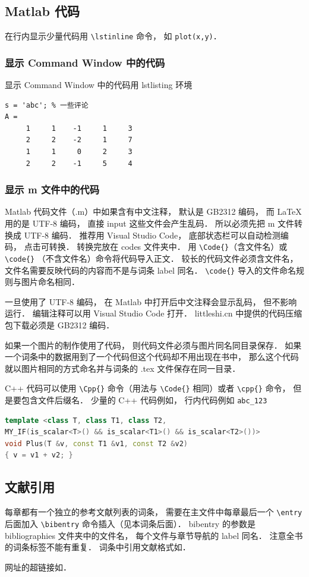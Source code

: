 \subsection{Matlab 代码}
在行内显示少量代码用 \lstinline|\lstinline| 命令， 如 \lstinline|plot(x,y)|．
\subsubsection{显示  Command Window 中的代码}
显示  Command Window 中的代码用 lstlisting 环境
\begin{lstlisting}[language=MatlabCom]
s = 'abc'; % 一些评论
A =
     1     1    -1     1     3
     2     2    -2     1     7
     1     1     0     2     3
     2     2    -1     5     4
\end{lstlisting}

\subsubsection{显示 m 文件中的代码}

Matlab 代码文件（.m）中如果含有中文注释， 默认是 GB2312 编码， 而 LaTeX 用的是 UTF-8 编码， 直接 input 这些文件会产生乱码． 所以必须先把 m 文件转换成 UTF-8 编码． 推荐用 Visual Studio Code， 底部状态栏可以自动检测编码， 点击可转换． 转换完放在 codes 文件夹中． 用 \lstinline|\Code{}|（含文件名）或  \lstinline|\code{}| （不含文件名）命令将代码导入正文． 较长的代码文件必须含文件名， 文件名需要反映代码的内容而不是与词条 label 同名． \lstinline|\code{}| 导入的文件命名规则与图片命名相同．

一旦使用了 UTF-8 编码， 在 Matlab 中打开后中文注释会显示乱码， 但不影响运行． 编辑注释可以用 Visual Studio Code 打开． littleshi.cn 中提供的代码压缩包下载必须是 GB2312 编码．

如果一个图片的制作使用了代码， 则代码文件必须与图片同名同目录保存． 如果一个词条中的数据用到了一个代码但这个代码却不用出现在书中， 那么这个代码就以图片相同的方式命名并与词条的 .tex 文件保存在同一目录． 


C++ 代码可以使用 \lstinline|\Cpp{}| 命令（用法与 \lstinline|\Code{}| 相同）或者 \lstinline|\cpp{}| 命令， 但是要包含文件后缀名． 少量的 C++ 代码例如， 行内代码例如 \lstinline|abc_123|
\begin{lstlisting}[language=cpp]
template <class T, class T1, class T2,
MY_IF(is_scalar<T>() && is_scalar<T1>() && is_scalar<T2>())>
void Plus(T &v, const T1 &v1, const T2 &v2)
{ v = v1 + v2; }
\end{lstlisting}

\subsection{文献引用}
每章都有一个独立的参考文献列表的词条， 需要在主文件中每章最后一个 \lstinline|\entry| 后面加入 \lstinline|\bibentry| 命令插入（见本词条后面）． bibentry 的参数是 bibliographies 文件夹中的文件名， 每个文件与章节导航的 label 同名． 注意全书的词条标签不能有重复． 词条中引用文献格式如\cite{PhysWiki}\cite{PhysWikiEng}．

网址的超链接如．

